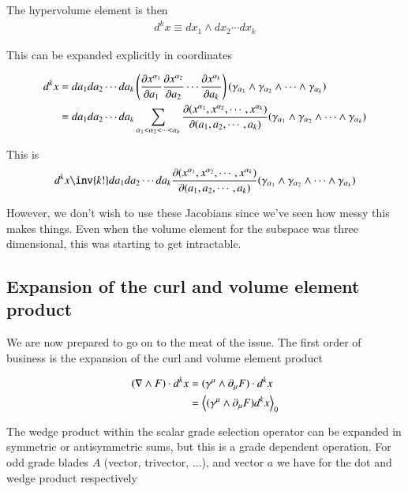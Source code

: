 The hypervolume element is then
\begin{align}
d^k x \equiv dx_1 \wedge dx_2 \cdots dx_k
\end{align}

This can be expanded explicitly in coordinates

\begin{align*}
d^k x 
&= da_1 da_2 \cdots da_k 
\left(
\PD{a_1}{x^{\alpha_1}} 
\PD{a_2}{x^{\alpha_2}} 
\cdots
\PD{a_k}{x^{\alpha_k}} 
\right)
( \gamma_{\alpha_1} \wedge \gamma_{\alpha_2} \wedge \cdots \wedge \gamma_{\alpha_k} ) \\
&= 
da_1 da_2 \cdots da_k 
\sum_{\alpha_1 < \alpha_2 < \cdots < \alpha_k}
\PD{(a_1, a_2, \cdots, a_k)}{(x^{\alpha_1}, x^{\alpha_2}, \cdots, x^{\alpha_k})}
( \gamma_{\alpha_1} \wedge \gamma_{\alpha_2} \wedge \cdots \wedge \gamma_{\alpha_k} ) \\
\end{align*}

This is
\begin{align}\label{eqn:jacobian}
d^k x 
\inv{k!}
da_1 da_2 \cdots da_k
\PD{(a_1, a_2, \cdots, a_k)}{(x^{\alpha_1}, x^{\alpha_2}, \cdots, x^{\alpha_k})}
( \gamma_{\alpha_1} \wedge \gamma_{\alpha_2} \wedge \cdots \wedge \gamma_{\alpha_k} ) 
\end{align}

However, we don't wish to use these Jacobians since we've seen how messy this makes things.  Even when the volume element for the subspace was three dimensional, this was starting to get intractable.

\subsection{Expansion of the curl and volume element product}

We are now prepared to go on to the meat of the issue.  The first order of business is the expansion of the curl and volume element product

\begin{align*}
( \grad \wedge F ) \cdot d^k x
&=
( \gamma^\mu \wedge \partial_\mu F ) \cdot d^k x \\
&=
\gpgradezero{ ( \gamma^\mu \wedge \partial_\mu F ) d^k x } \\
\end{align*}

The wedge product within the scalar grade selection operator can be expanded in symmetric or antisymmetric sums, but this is a grade dependent operation.  For odd grade blades $A$ (vector, trivector, ...), and vector $a$ we have for the dot and wedge product respectively

